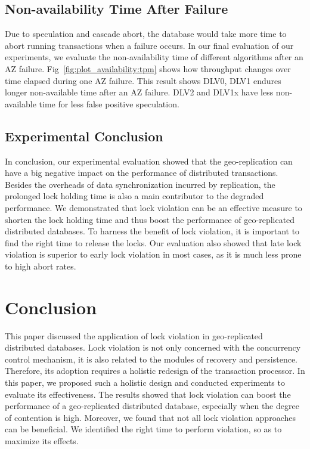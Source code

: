 \documentclass[conference]{IEEEtran}
\begin{document}
\subsection{Non-availability Time After Failure}

Due to speculation and cascade abort, the database would take more time to abort running transactions when a failure occurs.
In our final evaluation of our experiments, we evaluate the non-availability time of different algorithms after an AZ failure.
Fig~\ref{fig:plot_availability:tpm} shows how throughput changes over time elapsed during one AZ failure.
This result shows DLV0, DLV1 endures longer non-available time after an AZ failure.
DLV2 and DLV1x have less non-available time for less false positive speculation.


\subsection{Experimental Conclusion}

In conclusion, our experimental evaluation showed that the geo-replication can have a big negative impact on the performance of distributed transactions.
Besides the overheads of data synchronization incurred by replication, the prolonged lock holding time is also a main contributor to the degraded performance.
We demonstrated that lock violation can be an effective measure to shorten the lock holding time and thus boost the performance of geo-replicated distributed databases.
To harness the benefit of lock violation, it is important to find the right time to release the locks.
Our evaluation also showed that late lock violation is superior to early lock violation in most cases, as it is much less prone to high abort rates.


\section{Conclusion}
\label{sec:conclusion}

This paper discussed the application of lock violation in geo-replicated distributed databases.
Lock violation is not only concerned with the concurrency control mechanism, it is also related to the modules of recovery and persistence.
Therefore, its adoption requires a holistic redesign of the transaction processor. 
In this paper, we proposed such a holistic design and conducted experiments to evaluate its effectiveness.
The results showed that lock violation can boost the performance of a geo-replicated distributed database, especially when the degree of contention is high.
Moreover, we found that not all lock violation approaches can be beneficial. We identified the right time to perform violation, so as to maximize its effects. 
\end{document}
